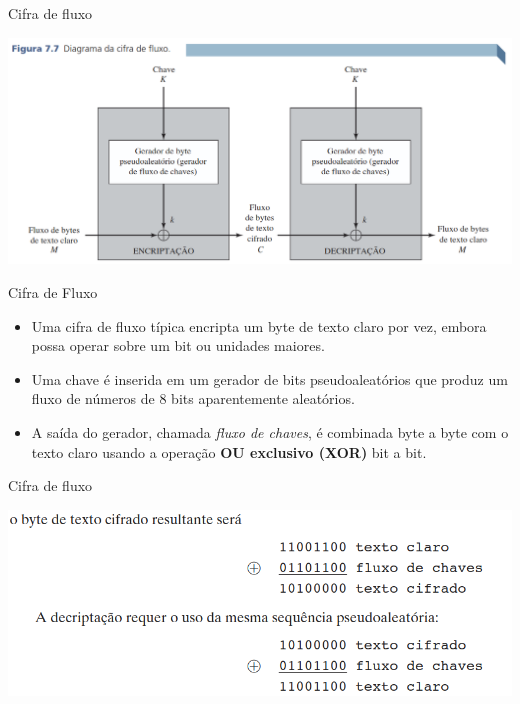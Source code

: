 \begin{frame}{Cifra de fluxo}

    

    \includegraphics[width=\linewidth]{Figuras/Cifra-de-fluxo.png}



\end{frame}


\begin{frame}{Cifra de Fluxo}
\begin{itemize}
    
    \item Uma cifra de fluxo típica encripta um byte de texto claro por vez, embora possa operar sobre um bit ou unidades maiores.
    \item Uma chave é inserida em um gerador de bits pseudoaleatórios que produz um fluxo de números de 8 bits aparentemente aleatórios.
    \item A saída do gerador, chamada \textit{fluxo de chaves}, é combinada byte a byte com o texto claro usando a operação \textbf{OU exclusivo (XOR)} bit a bit.

\end{itemize}
\end{frame}

\begin{frame}{Cifra de fluxo}

    

    \includegraphics[width=\linewidth]{Figuras/xor-cifrado-fluxo.png}



\end{frame}


